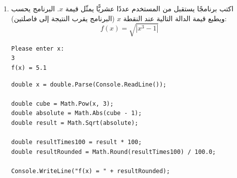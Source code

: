 \documentclass[14pt]{extarticle}
\begin{document}
\begin{enumerate}[itemsep=3em]
    \item
    اكتب برنامجًا يستقبل من المستخدم عددًا عشريًّا يمثّل قيمة $x$.
    البرنامج يحسب ويطبع قيمة الدالة التالية عند النقطة $x$ (البرنامج يقرب النتيجة إلى فاصلتين):
    $$ f(x) = \sqrt{|x^3 - 1|} $$
    \ifdetailed
    \begin{boxExample}
    \begin{english}
    \begin{verbatim}
Please enter x:
3
f(x) = 5.1
    \end{verbatim}
    \end{english}
    \end{boxExample}
    \ifwithsols
    \begin{boxSolution}
    \begin{english}
    \begin{verbatim}
double x = double.Parse(Console.ReadLine());

double cube = Math.Pow(x, 3);
double absolute = Math.Abs(cube - 1);
double result = Math.Sqrt(absolute);

double resultTimes100 = result * 100;
double resultRounded = Math.Round(resultTimes100) / 100.0;

Console.WriteLine("f(x) = " + resultRounded);
    \end{verbatim}
    \end{english}
    \end{boxSolution}
    \fi
    \fi

\end{enumerate}
\end{document}
